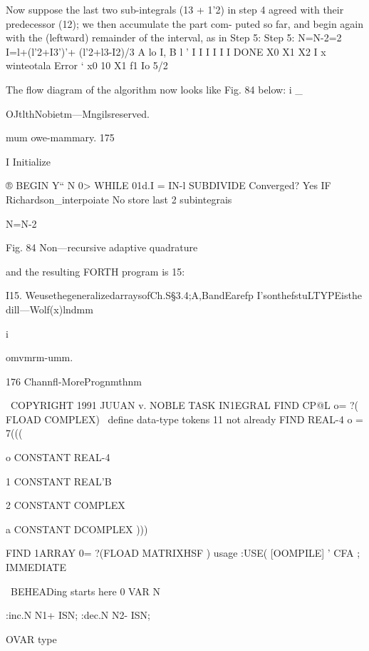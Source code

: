 Now suppose the last two sub-integrals (13 + 1’2) in step 4 agreed
with their predecessor (12); we then accumulate the part com-
puted so far, and begin again with the (leftward) remainder of the
interval, as in Step 5:
Step 5: N=N-2=2 I=l+(l'2+I3')'+ (l'2+l3-I2)/3
A lo I, B
l ' I I I
I I I DONE
X0 X1 X2 I
x winteotala Error ‘
x0 10
X1 f1 Io 5/2

The flow diagram of the algorithm now looks like Fig. 84 below: i _

OJtlthNobietm—Mngilsreserved.

 

mum owe-mammary. 175

 

I Initialize

 

® BEGIN
Y“ N 0>
WHILE
01d.I = IN-l
SUBDIVIDE Converged?
Yes
IF Richardson_interpoiate
No store last 2 subintegrais

N=N-2

 

 

 

 

 

 

Fig. 84 Non—recursive adaptive quadrature

and the resulting FORTH program is 15:

I15. WeusethegeneralizedarraysofCh.S§3.4;A,BandEarefp I'sonthefstuLTYPEisthe
dill—Wolf(x)lndmm

 

i

omvmrm-umm.

176 Channﬂ-MorePrognmthnm

\ COPYRIGHT 1991 JUUAN v. NOBLE
TASK IN1EGRAL
FIND CP@L o= ?( FLOAD COMPLEX)
\ deﬁne data-type tokens 11 not already
FIND REAL-4 o = 7(((

o CONSTANT REAL-4

1 CONSTANT REAL'B

2 CONSTANT COMPLEX

a CONSTANT DCOMPLEX )))

FIND 1ARRAY 0= ?(FLOAD MATRIXHSF )
\function usage
:USE( [OOMPILE] ' CFA ; IMMEDIATE

\ BEHEADing starts here
0 VAR N

:inc.N N1+ ISN;
:dec.N N2- ISN;

OVAR type

